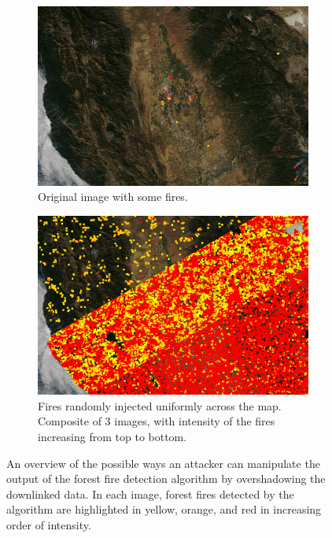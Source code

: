 \begin{figure}
    \centering
    \begin{subfigure}{0.49\textwidth}
        \centering
        \includegraphics[width=\textwidth]{diagrams/injection/original.jpg}
        \caption{Original image with some fires.\newline}
        \label{fig:injection-orig}
    \end{subfigure}
    \begin{subfigure}{0.49\textwidth}
        \centering
        \includegraphics[width=\textwidth]{diagrams/injection/random_combined_diagonal.jpg}
        \caption{Fires randomly injected uniformly across the map. Composite of 3 images, with intensity of the fires increasing from top to bottom.}
        \label{fig:injection-random}
    \end{subfigure}
    \caption{An overview of the possible ways an attacker can manipulate the output of the forest fire detection algorithm by overshadowing the downlinked data. In each image, forest fires detected by the algorithm are highlighted in yellow, orange, and red in increasing order of intensity.}
    \label{fig:injection}
\end{figure}


